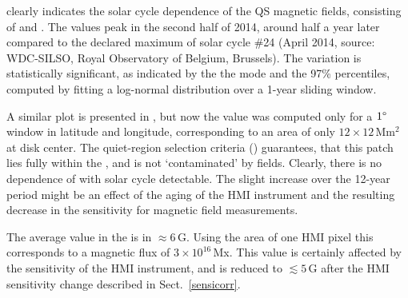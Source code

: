 \documentclass{aa}
\begin{document}
 clearly indicates the solar cycle dependence of the 
QS
magnetic fields, consisting of \NW{} and \IN{}. The \brms{} values peak in the second half of 2014, 
around half a year
later compared to the
declared maximum of solar cycle \#24 (April 2014, source: WDC-SILSO, Royal Observatory of Belgium, Brussels). The variation is statistically significant, as indicated by the the mode and the 97\% percentiles, computed by fitting a log-normal distribution over a 1-year sliding window.

A similar plot is presented in , but now the \brms{} value was computed only for a $1\degree$ window in latitude and longitude, corresponding to an area of only $12\times 12$\,Mm$^2$ at disk center. The quiet-region selection criteria () guarantees, that this patch lies fully within the \IN{}, and is not `contaminated' by \NW{} fields. Clearly, there is no dependence of \brms{} with solar cycle detectable. The 
slight increase over the 12-year period might be an effect of the aging of the HMI instrument and the resulting decrease in the sensitivity for magnetic field measurements.

The average \brms{} value in the \IN{} is in $\approx6$\,G. Using the area of one HMI pixel this corresponds to a magnetic flux of $3\times 10^{16}$\,Mx. 
This value is certainly affected by the sensitivity of the HMI instrument, and is reduced to $\lesssim5$\,G after the HMI sensitivity change described in Sect.~\ref{sensicorr}.




\end{document}
